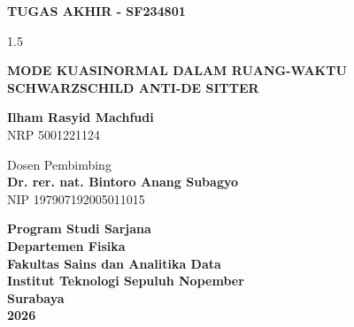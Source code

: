   \begin{large}
    \textbf{TUGAS AKHIR - SF234801}
  \end{large}

  \vspace{\fill}

  \begin{spacing}{1.5}
    \begin{Large}
      \textbf{MODE KUASINORMAL DALAM RUANG-WAKTU SCHWARZSCHILD ANTI-DE SITTER}
    \end{Large}
  \end{spacing}

  \vspace{\fill}

  \begin{large}
    \textbf{Ilham Rasyid Machfudi} \\
    \textmd{NRP 5001221124}
  \end{large}

  \vspace{\fill}

  \begin{large}
    \textmd{Dosen Pembimbing} \\
    \textbf{Dr. rer. nat. Bintoro Anang Subagyo} \\
    \textmd{NIP 197907192005011015} \\
  \end{large}

  \vspace{\fill}

  \begin{large}
    \textbf{Program Studi Sarjana} \\
    \textbf{Departemen Fisika} \\
    \textbf{Fakultas Sains dan Analitika Data} \\
    \textbf{Institut Teknologi Sepuluh Nopember} \\
    \textbf{Surabaya}\\
    \textbf{2026}
  \end{large}